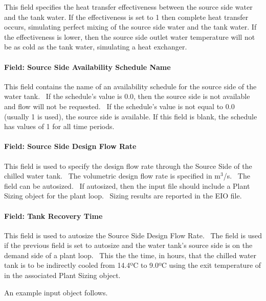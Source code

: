 This field specifies the heat transfer effectiveness between the source side water and the tank water. If the effectiveness is set to 1 then complete heat transfer occurs, simulating perfect mixing of the source side water and the tank water. If the effectiveness is lower, then the source side outlet water temperature will not be as cold as the tank water, simulating a heat exchanger.

\paragraph{Field: Source Side Availability Schedule Name}\label{field-source-side-availability-schedule-name}

This field contains the name of an availability schedule for the source side of the water tank.~ If the schedule's value is 0.0, then the source side is not available and flow will not be requested.~ If the schedule's value is not equal to 0.0 (usually 1 is used), the source side is available. If this field is blank, the schedule has values of 1 for all time periods.

\paragraph{Field: Source Side Design Flow Rate}\label{field-source-side-design-flow-rate}

This field is used to specify the design flow rate through the Source Side of the chilled water tank.~ The volumetric design flow rate is specified in m\(^{3}\)/s.~ The field can be autosized.~ If autosized, then the input file should include a Plant Sizing object for the plant loop.~ Sizing results are reported in the EIO file.

\paragraph{Field: Tank Recovery Time}\label{field-tank-recovery-time}

This field is used to autosize the Source Side Design Flow Rate.~ The field is used if the previous field is set to autosize and the water tank's source side is on the demand side of a plant loop.~ This the the time, in hours, that the chilled water tank is to be indirectly cooled from 14.4ºC to 9.0ºC using the exit temperature of in the associated Plant Sizing object.

An example input object follows.

